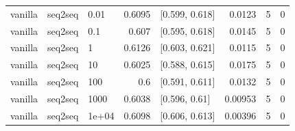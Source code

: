 \documentclass[10pt]{article}
\begin{document}
{\begin{longtable}{lllrlrrr}
vanilla & seq2seq & 0.01 & 0.6095 & [0.599, 0.618] & 0.0123 & 5 & 0\\
vanilla & seq2seq & 0.1 & 0.607 & [0.595, 0.618] & 0.0145 & 5 & 0\\
vanilla & seq2seq & 1 & 0.6126 & [0.603, 0.621] & 0.0115 & 5 & 0\\
vanilla & seq2seq & 10 & 0.6025 & [0.588, 0.615] & 0.0175 & 5 & 0\\
vanilla & seq2seq & 100 & 0.6 & [0.591, 0.611] & 0.0132 & 5 & 0\\
vanilla & seq2seq & 1000 & 0.6038 & [0.596, 0.61] & 0.00953 & 5 & 0\\
vanilla & seq2seq & 1e+04 & 0.6098 & [0.606, 0.613] & 0.00396 & 5 & 0\\
\bottomrule
\end{longtable}
}
\end{document}
